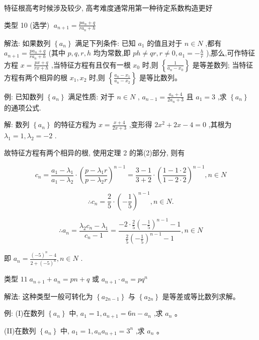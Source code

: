 \documentclass[10pt,cn]{elegantbook}
\begin{document}
特征根高考时候涉及较少, 高考难度通常用第一种待定系数构造更好

类型 10 (选学) \(\;{a}_{n + 1} = \frac{p{a}_{n} + q}{r{a}_{n} + h}\)

解法: 如果数列 \(\left\{ {a}_{n}\right\}\) 满足下列条件: 已知 \({a}_{1}\) 的值且对于 \(n \in N\) ,都有 \({a}_{n + 1} = \frac{p{a}_{n} + q}{r{a}_{n} + h}\) (其中 \(p,q,r,h\) 均为常数,即 \({ph} \neq {qr},r \neq 0,{a}_{1} = - \frac{h}{r}\) ),那么,可作特征方程 \(x = \frac{{px} + q}{{rx} + h}\) ,当特征方程有且仅有一根 \({x}_{0}\) 时,则 \(\left\{ \frac{1}{{a}_{n} - {x}_{0}}\right\}\) 是等差数列; 当特征方程有两个相异的根 \({x}_{1},{x}_{2}\) 时,则 \(\left\{ \frac{{a}_{n} - {x}_{1}}{{a}_{n} - {x}_{2}}\right\}\) 是等比数列。

例: 已知数列 \(\left\{ {a}_{n}\right\}\) 满足性质: 对于 \(n \in N\) , \({a}_{n - 1} = \frac{{a}_{n} + 4}{2{a}_{n} + 3}\) 且 \({a}_{1} = 3\) ,求 \(\left\{ {a}_{n}\right\}\) 的通项公式.

解: 数列 \(\left\{ {a}_{n}\right\}\) 的特征方程为 \(x = \frac{x + 4}{{2x} + 3}\) ,变形得 \(2{x}^{2} + {2x} - 4 = 0\) ,其根为 \({\lambda }_{1} = 1,{\lambda }_{2} = - 2\) .

故特征方程有两个相异的根, 使用定理 2 的第(2)部分, 则有

\[
{c}_{n} = \frac{{a}_{1} - {\lambda }_{1}}{{a}_{1} - {\lambda }_{2}} \cdot {\left( \frac{p - {\lambda }_{1}r}{p - {\lambda }_{2}r}\right) }^{n - 1} = \frac{3 - 1}{3 + 2} \cdot {\left( \frac{1 - 1 \cdot 2}{1 - 2 \cdot 2}\right) }^{n - 1},n \in N
\]

\[
\therefore {c}_{n} = \frac{2}{5} \cdot {\left( -\frac{1}{5}\right) }^{n - 1},n \in N\text{.}
\]

\[
\therefore {a}_{n} = \frac{{\lambda }_{2}{c}_{n} - {\lambda }_{1}}{{c}_{n} - 1} = \frac{-2 \cdot \frac{2}{5}{\left( -\frac{1}{5}\right) }^{n - 1} - 1}{\frac{2}{5}{\left( -\frac{1}{5}\right) }^{n - 1} - 1},n \in N
\]

即 \({a}_{n} = \frac{{\left( -5\right) }^{n} - 4}{2 + {\left( -5\right) }^{n}},n \in N\) .

类型 \({11}\;{a}_{n + 1} + {a}_{n} = {pn} + q\) 或 \({a}_{n + 1} \cdot {a}_{n} = p{q}^{n}\)

解法: 这种类型一般可转化为 \(\left\{ {a}_{{2n} - 1}\right\}\) 与 \(\left\{ {a}_{2n}\right\}\) 是等差或等比数列求解。

例: (I)在数列 \(\left\{ {a}_{n}\right\}\) 中, \({a}_{1} = 1,{a}_{n + 1} = {6n} - {a}_{n}\) ,求 \({a}_{n}\) 。

(II)在数列 \(\left\{ {a}_{n}\right\}\) 中, \({a}_{1} = 1,{a}_{n}{a}_{n + 1} = {3}^{n}\) ,求 \({a}_{n}\) 。
\end{document}
